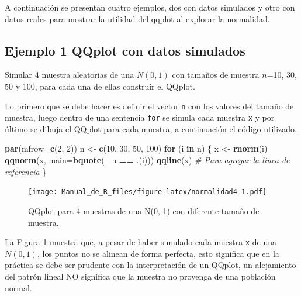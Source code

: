 \documentclass[10pt,]{krantz}
\makeatletter
\newenvironment{Shaded}{\begin{snugshade}}{\end{snugshade}}
\newcommand{\KeywordTok}[1]{\textcolor[rgb]{0.13,0.29,0.53}{\textbf{#1}}}
\newcommand{\DataTypeTok}[1]{\textcolor[rgb]{0.13,0.29,0.53}{#1}}
\newcommand{\DecValTok}[1]{\textcolor[rgb]{0.00,0.00,0.81}{#1}}
\newcommand{\StringTok}[1]{\textcolor[rgb]{0.31,0.60,0.02}{#1}}
\newcommand{\CommentTok}[1]{\textcolor[rgb]{0.56,0.35,0.01}{\textit{#1}}}
\newcommand{\ControlFlowTok}[1]{\textcolor[rgb]{0.13,0.29,0.53}{\textbf{#1}}}
\newcommand{\OperatorTok}[1]{\textcolor[rgb]{0.81,0.36,0.00}{\textbf{#1}}}
\newcommand{\NormalTok}[1]{#1}
\newenvironment{kframe}{%
\medskip{}
\setlength{\fboxsep}{.8em}
 \def\at@end@of@kframe{}%
 \ifinner\ifhmode%
  \def\at@end@of@kframe{\end{minipage}}%
  \begin{minipage}{\columnwidth}%
 \fi\fi%
 \def\FrameCommand##1{\hskip\@totalleftmargin \hskip-\fboxsep
 \colorbox{shadecolor}{##1}\hskip-\fboxsep
     \hskip-\linewidth \hskip-\@totalleftmargin \hskip\columnwidth}%
 \MakeFramed {\advance\hsize-\width
   \@totalleftmargin\z@ \linewidth\hsize
   \@setminipage}}%
 {\par\unskip\endMakeFramed%
 \at@end@of@kframe}
\renewenvironment{Shaded}{\begin{kframe}}{\end{kframe}}
\makeatother
\begin{document}
A continuación se presentan cuatro ejemplos, dos con datos simulados y
otro con datos reales para mostrar la utilidad del qqplot al explorar la
normalidad.

\subsection*{Ejemplo 1 QQplot con datos
simulados}\label{ejemplo-1-qqplot-con-datos-simulados}


Simular 4 muestra aleatorias de una \(N(0, 1)\) con tamaños de muestra
\(n\)=10, 30, 50 y 100, para cada una de ellas construir el QQplot.

Lo primero que se debe hacer es definir el vector \texttt{n} con los
valores del tamaño de muestra, luego dentro de una sentencia
\texttt{for} se simula cada muestra \texttt{x} y por último se dibuja el
QQplot para cada muestra, a continuación el código utilizado.

\begin{Shaded}
\begin{Highlighting}[]
\KeywordTok{par}\NormalTok{(}\DataTypeTok{mfrow=}\KeywordTok{c}\NormalTok{(}\DecValTok{2}\NormalTok{, }\DecValTok{2}\NormalTok{))}
\NormalTok{n <-}\StringTok{ }\KeywordTok{c}\NormalTok{(}\DecValTok{10}\NormalTok{, }\DecValTok{30}\NormalTok{, }\DecValTok{50}\NormalTok{, }\DecValTok{100}\NormalTok{)}
\ControlFlowTok{for}\NormalTok{ (i }\ControlFlowTok{in}\NormalTok{ n) \{}
\NormalTok{  x <-}\StringTok{ }\KeywordTok{rnorm}\NormalTok{(i)}
  \KeywordTok{qqnorm}\NormalTok{(x, }\DataTypeTok{main=}\KeywordTok{bquote}\NormalTok{(}\OperatorTok{~}\StringTok{ }\NormalTok{n }\OperatorTok{==}\StringTok{ }\NormalTok{.(i)))}
  \KeywordTok{qqline}\NormalTok{(x)  }\CommentTok{# Para agregar la linea de referencia}
\NormalTok{\}}
\end{Highlighting}
\end{Shaded}

\begin{figure}
\centering
\texttt{[image: Manual\_de\_R\_files/figure-latex/normalidad4-1.pdf]}
\caption{\label{fig:normalidad4}QQplot para 4 muestras de una N(0, 1) con
diferente tamaño de muestra.}
\end{figure}

La Figura \ref{fig:normalidad4} muestra que, a pesar de haber simulado
cada muestra \texttt{x} de una \(N(0, 1)\), los puntos no se alinean de
forma perfecta, esto significa que en la práctica se debe ser prudente
con la interpretación de un QQplot, un alejamiento del patrón lineal NO
significa que la muestra no provenga de una población normal.
\end{document}
